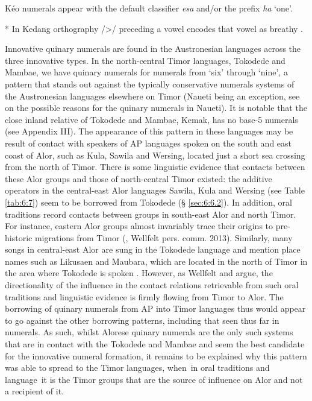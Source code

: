 \begin{table}
\vspace{.5cm}
\normalsize
  {\dag} K\'eo numerals appear with the default classifier \textit{{\textglotstop}esa} and/or the prefix \textit{ha} `one'.

      * In Kedang orthography /{\textgreater}/ preceding a vowel encodes that vowel as breathy \citep{Samely1991}.


\label{tab:6:10}
\end{table}

    Innovative quinary numerals are found in the Austronesian languages across the three innovative types. In the north-central Timor languages, Tokodede and Mambae, we have quinary numerals for numerals from `six' through `nine', a pattern that stands out against the typically conservative numerals systems of the Austronesian languages elsewhere on Timor (Naueti being an exception, see \citet{SchapperEtAl2013} on the possible reasons for the quinary numerals in Naueti). It is notable that the close inland relative of Tokodede and Mambae, Kemak, has no base-5 numerals (see Appendix III). The appearance of this pattern in these languages may be result of contact with speakers of AP languages spoken on the south and east coast of Alor, such as Kula, Sawila and Wersing, located just a short sea crossing from the north of Timor. There is some linguistic evidence that contacts between these Alor groups and those of north-central Timor existed: the additive operators in the central-east Alor languages Sawila, Kula and Wersing (see Table \ref{tab:6:7}) seem to be borrowed from Tokodede ({\S} \ref{sec:6:6.2}). In addition, oral traditions record contacts between groups in south-east Alor and north Timor. For instance, eastern Alor groups almost invariably trace their origins to pre-historic migrations from Timor (\citealt{WellfeltEtAl2013}, Wellfelt pers. comm. 2013). Similarly, many songs in central-east Alor are sung in the Tokodede language and mention place names such as Likusaen and Maubara, which are located in the north of Timor in the area where Tokodede is spoken \citep{WellfeltEtAl2013}. However, as Wellfelt and \citet{Schapper2013} argue, the directionality of the influence in the contact relations retrievable from such oral traditions and linguistic evidence is firmly flowing from Timor to Alor. The borrowing of quinary numerals from AP into Timor languages thus would appear to go against the other borrowing patterns, including that seen thus far in numerals. As such, whilst Alorese quinary numerals are the only such systems that are in contact with the Tokodede and Mambae and seem the best candidate for the innovative numeral formation, it remains to be explained why this pattern was able to spread to the Timor languages, when~in oral traditions and language~it is the Timor groups that are the source of influence on Alor and not a recipient of it.

